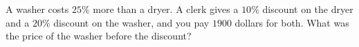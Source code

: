 A washer costs $25\%$ more than a dryer. A clerk gives a $10\%$ discount on the dryer and a $20\%$ discount on the washer, and you pay $1900$ dollars for both. What was the price of the washer before the discount?
